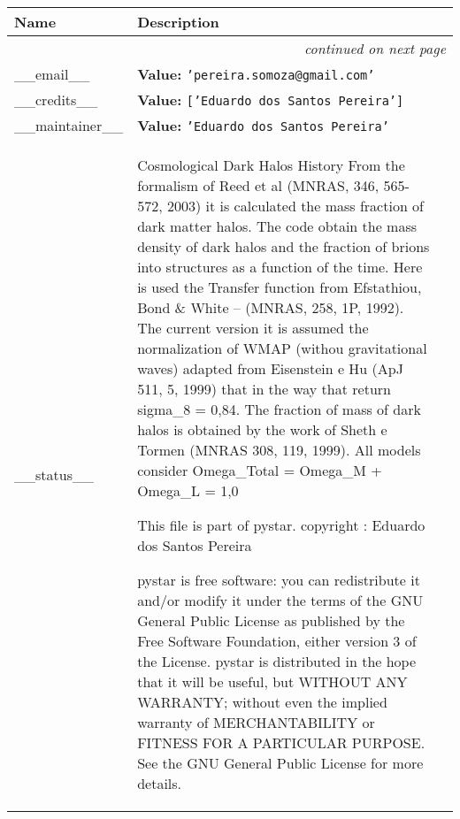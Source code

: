     \vspace{-1cm}
\hspace{\varindent}\begin{longtable}{|p{\varnamewidth}|p{\vardescrwidth}|l}
\cline{1-2}
\cline{1-2} \centering \textbf{Name} & \centering \textbf{Description}& \\
\cline{1-2}
\endhead\cline{1-2}\multicolumn{3}{r}{\small\textit{continued on next page}}\\\endfoot\cline{1-2}
\endlastfoot\raggedright \_\-\_\-e\-m\-a\-i\-l\-\_\-\_\- & \raggedright \textbf{Value:} 
{\tt \texttt{'}\texttt{pereira.somoza@gmail.com}\texttt{'}}&\\
\cline{1-2}
\raggedright \_\-\_\-c\-r\-e\-d\-i\-t\-s\-\_\-\_\- & \raggedright \textbf{Value:} 
{\tt \texttt{[}\texttt{'}\texttt{Eduardo dos Santos Pereira}\texttt{'}\texttt{]}}&\\
\cline{1-2}
\raggedright \_\-\_\-m\-a\-i\-n\-t\-a\-i\-n\-e\-r\-\_\-\_\- & \raggedright \textbf{Value:} 
{\tt \texttt{'}\texttt{Eduardo dos Santos Pereira}\texttt{'}}&\\
\cline{1-2}
\raggedright \_\-\_\-s\-t\-a\-t\-u\-s\-\_\-\_\- & \raggedright Cosmological Dark Halos History From the formalism of Reed et al 
          (MNRAS, 346, 565-572, 2003) it is calculated the mass fraction of
          dark matter halos. The code obtain the mass density of dark halos
          and the fraction of brions into structures as a function of the 
          time. Here is used the Transfer function from Efstathiou, Bond \&
          White -- (MNRAS, 258, 1P, 1992). The current version it is 
          assumed the normalization of WMAP (withou gravitational waves) 
          adapted from Eisenstein e Hu (ApJ 511, 5, 1999) that in the way 
          that return  sigma\_8 = 0,84. The fraction of mass of dark halos 
          is obtained by the work of Sheth e Tormen (MNRAS 308, 119, 1999).
          All models consider Omega\_Total = Omega\_M + Omega\_L = 1,0

          This file is part of pystar. copyright : Eduardo dos Santos 
          Pereira

          pystar is free software: you can redistribute it and/or modify it
          under the terms of the GNU General Public License as published by
          the Free Software Foundation, either version 3 of the License. 
          pystar is distributed in the hope that it will be useful, but 
          WITHOUT ANY WARRANTY; without even the implied warranty of 
          MERCHANTABILITY or FITNESS FOR A PARTICULAR PURPOSE.  See the GNU
          General Public License for more details.


\end{longtable}
